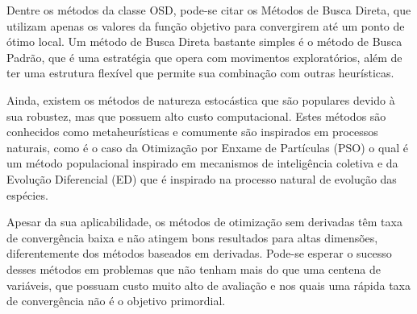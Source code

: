 \documentclass[a4paper,12pt]{monografia}
\theoremstyle{plain}
\theoremstyle{definition}
\theoremstyle{remark}
\begin{document}
Dentre os métodos da classe OSD, pode-se citar os Métodos de Busca Direta, que utilizam
apenas os valores da função objetivo para convergirem até um ponto de ótimo local. 
Um método de Busca Direta bastante simples é o método de Busca Padrão, que é uma estratégia que opera com movimentos exploratórios, além de ter uma estrutura flexível
que permite sua combinação com outras heurísticas.

Ainda, existem os métodos de natureza estocástica que são populares devido à sua
robustez, mas que possuem alto custo computacional. Estes métodos são conhecidos como metaheurísticas e comumente são inspirados em processos naturais, como é o caso da Otimização por Enxame de Partículas (PSO) o qual é um método populacional inspirado em mecanismos de inteligência coletiva e da Evolução Diferencial (ED) que é inspirado na processo natural de evolução das espécies.

Apesar da sua aplicabilidade, os métodos de otimização sem derivadas têm taxa de convergência baixa e não atingem bons resultados para altas dimensões, diferentemente
dos métodos baseados em derivadas. Pode-se esperar o sucesso desses métodos em problemas
que não tenham mais do que uma centena de variáveis, que possuam custo muito alto de avaliação e nos quais uma rápida taxa de convergência não é o objetivo primordial. 
\end{document}
